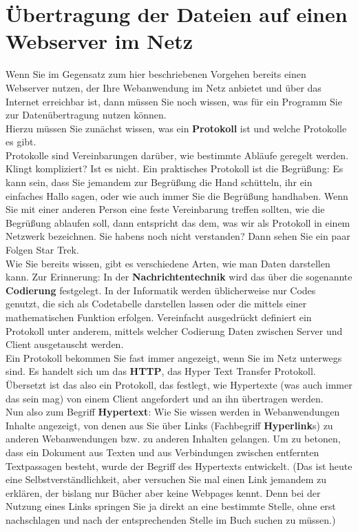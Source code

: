 \section{Übertragung der Dateien auf einen Webserver im Netz}

Wenn Sie im Gegensatz zum hier beschriebenen Vorgehen bereits einen Webserver nutzen, der Ihre Webanwendung im Netz anbietet und über das Internet erreichbar ist, dann müssen Sie noch wissen, was für ein Programm Sie zur Datenübertragung nutzen können.\\

Hierzu müssen Sie zunächst wissen, was ein \textbf{Protokoll} ist und welche Protokolle es gibt.\\

Protokolle sind Vereinbarungen darüber, wie bestimmte Abläufe geregelt werden. Klingt kompliziert? Ist es nicht. Ein praktisches Protokoll ist die Begrüßung: Es kann sein, dass Sie jemandem zur Begrüßung die Hand schütteln, ihr ein einfaches Hallo sagen, oder wie auch immer Sie die Begrüßung handhaben. Wenn Sie mit einer anderen Person eine feste Vereinbarung treffen sollten, wie die Begrüßung ablaufen soll, dann entspricht das dem, was wir als Protokoll in einem Netzwerk bezeichnen. Sie habens noch nicht verstanden? Dann sehen Sie ein paar Folgen Star Trek.\\

Wie Sie bereits wissen, gibt es verschiedene Arten, wie man Daten darstellen kann. Zur Erinnerung: In der \textbf{Nachrichtentechnik} wird das über die sogenannte \textbf{Codierung} festgelegt. In der Informatik werden üblicherweise nur Codes genutzt, die sich als Codetabelle darstellen lassen oder die mittels einer mathematischen Funktion erfolgen. Vereinfacht ausgedrückt definiert ein Protokoll unter anderem, mittels welcher Codierung Daten zwischen Server und Client ausgetauscht werden.\\

Ein Protokoll bekommen Sie fast immer angezeigt, wenn Sie im Netz unterwegs sind. Es handelt sich um das \textbf{HTTP}, das Hyper Text Transfer Protokoll. Übersetzt ist das also ein Protokoll, das festlegt, wie Hypertexte (was auch immer das sein mag) von einem Client angefordert und an ihn übertragen werden.\\

Nun also zum Begriff \textbf{Hypertext}: Wie Sie wissen werden in Webanwendungen Inhalte angezeigt, von denen aus Sie über Links (Fachbegriff \textbf{Hyperlink}s) zu anderen Webanwendungen bzw. zu anderen Inhalten gelangen. Um zu betonen, dass ein Dokument aus Texten und aus Verbindungen zwischen entfernten Textpassagen besteht, wurde der Begriff des Hypertexts entwickelt. (Das ist heute eine Selbstverständlichkeit, aber versuchen Sie mal einen Link jemandem zu erklären, der bislang nur Bücher aber keine Webpages kennt. Denn bei der Nutzung eines Links springen Sie ja direkt an eine bestimmte Stelle, ohne erst nachschlagen und nach der entsprechenden Stelle im Buch suchen zu müssen.)\\

